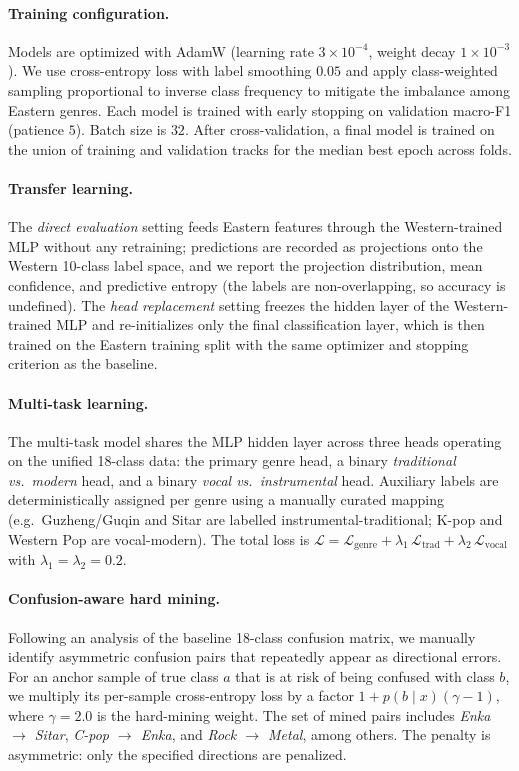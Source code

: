 \documentclass{article}
\begin{document}
\paragraph{Training configuration.}
Models are optimized with AdamW (learning rate $3\times 10^{-4}$, weight
decay $1\times 10^{-3}$). We use cross-entropy loss with label smoothing
$0.05$ and apply class-weighted sampling proportional to inverse class
frequency to mitigate the imbalance among Eastern genres. Each model is
trained with early stopping on validation macro-F1
(patience $5$). Batch size is $32$.
After cross-validation, a final model is trained on the union of training
and validation tracks for the median best epoch across folds.

\paragraph{Transfer learning.}
The \emph{direct evaluation} setting feeds Eastern features through the
Western-trained MLP without any retraining; predictions are recorded as
projections onto the Western 10-class label space, and we report the
projection distribution, mean confidence, and predictive entropy (the
labels are non-overlapping, so accuracy is undefined). The
\emph{head replacement} setting freezes the hidden layer of the
Western-trained MLP and re-initializes only the final classification
layer, which is then trained on the Eastern training split with the
same optimizer and stopping criterion as the baseline.

\paragraph{Multi-task learning.}
The multi-task model shares the MLP hidden layer across three heads
operating on the unified 18-class data: the primary genre head, a binary
\emph{traditional vs.\ modern} head, and a binary \emph{vocal vs.\
instrumental} head. Auxiliary labels are deterministically assigned per
genre using a manually curated mapping (e.g.\ Guzheng/Guqin and Sitar are
labelled instrumental-traditional; K-pop and Western Pop are
vocal-modern). The total loss is
$\mathcal{L} = \mathcal{L}_{\mathrm{genre}} + \lambda_1\,\mathcal{L}_{\mathrm{trad}}
+ \lambda_2\,\mathcal{L}_{\mathrm{vocal}}$ with
$\lambda_1 = \lambda_2 = 0.2$.

\paragraph{Confusion-aware hard mining.}
Following an analysis of the baseline 18-class confusion matrix, we manually identify
asymmetric confusion pairs that repeatedly appear as directional errors. For an
anchor sample of true class $a$ that is at risk of being confused with class $b$,
we multiply its per-sample cross-entropy loss by a factor
$1 + p(b \mid x)(\gamma - 1)$, where $\gamma=2.0$ is the hard-mining weight. The set of mined pairs includes
\emph{Enka $\to$ Sitar}, \emph{C-pop $\to$ Enka}, and \emph{Rock $\to$ Metal},
among others. The penalty is asymmetric: only the specified directions
are penalized.
\end{document}
